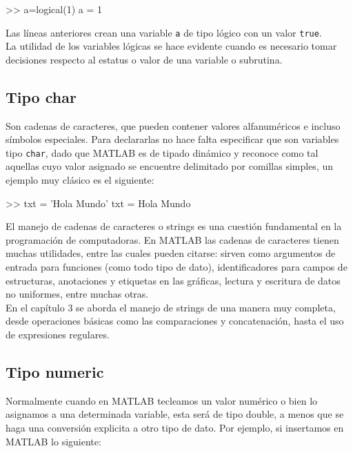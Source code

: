 \begin{matlab}
>> a=logical(1)
a =
     1
\end{matlab}

Las líneas anteriores crean una variable \texttt{a} de tipo lógico con
un valor \texttt{true}. \\

La utilidad de los variables lógicas se hace evidente cuando es necesario 
tomar decisiones respecto al estatus o valor de una variable o subrutina.

\subsection{Tipo char}

Son cadenas de caracteres, que pueden contener valores alfanuméricos e
incluso símbolos especiales. Para declararlas no hace falta especificar
que son variables tipo \texttt{char}, dado que MATLAB es de tipado dinámico y
reconoce como tal aquellas cuyo valor asignado se encuentre delimitado
por comillas simples, un ejemplo muy clásico es el siguiente:

\begin{matlab}
>> txt = 'Hola Mundo'
txt =
Hola Mundo
\end{matlab}

El manejo de cadenas de caracteres o strings es una cuestión fundamental 
en la programación de computadoras. En MATLAB las cadenas de caracteres 
tienen muchas utilidades, entre las cuales pueden citarse: sirven como 
argumentos de entrada para funciones (como todo tipo de dato), identificadores 
para campos de estructuras, anotaciones y etiquetas en las gráficas, 
lectura y escritura de datos no uniformes, entre muchas otras. \\

En el capítulo 3 se aborda el manejo de strings de una manera muy completa, 
desde operaciones básicas como las comparaciones y concatenación, hasta el 
uso de expresiones regulares.

\subsection{Tipo numeric}

Normalmente cuando en MATLAB tecleamos un valor numérico o bien lo
asignamos a una determinada variable, esta será de tipo double, a menos
que se haga una conversión explicita a otro tipo de dato. Por ejemplo,
si insertamos en MATLAB lo siguiente:

